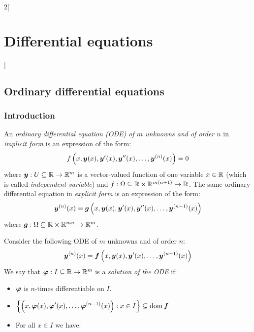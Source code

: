 \documentclass[../../../main.tex]{subfiles}
\begin{document}
\begin{multicols}{2}[\section{Differential equations}]
  \subsection{Ordinary differential equations}
  \subsubsection*{Introduction}
  \begin{definition}
    An \textit{ordinary differential equation (ODE) of $m$ unknowns and of order $n$} in \textit{implicit form} is an expression of the form: $$f\left(x,\boldsymbol{y}(x),\boldsymbol{y}'(x),\boldsymbol{y}''(x),\ldots,\boldsymbol{y}^{(n)}(x)\right)=0$$
    where $\boldsymbol{y}:U\subseteq\mathbb{R}\rightarrow\mathbb{R}^m$ is a vector-valued function of one variable $x\in\mathbb{R}$ (which is called \textit{independent variable}) and $f:\Omega\subseteq\mathbb{R}\times\mathbb{R}^{m(n+1)}\rightarrow\mathbb{R}$. The same ordinary differential equation in \textit{explicit form} is an expression of the form: $$\boldsymbol{y}^{(n)}(x)=\boldsymbol{g}\left(x,\boldsymbol{y}(x),\boldsymbol{y}'(x),\boldsymbol{y}''(x),\ldots,\boldsymbol{y}^{(n-1)}(x)\right)$$
    where $\boldsymbol{g}:\Omega\subseteq\mathbb{R}\times\mathbb{R}^{mn}\rightarrow\mathbb{R}^m$.
  \end{definition}
  \begin{definition}
    Consider the following ODE of $m$ unknowns and of order $n$:
    \begin{equation}\label{DE_ode1}
      \boldsymbol{y}^{(n)}(x)=\boldsymbol{f}\left(x,\boldsymbol{y}(x),\boldsymbol{y}'(x),\ldots,\boldsymbol{y}^{(n-1)}(x)\right)
    \end{equation}
    We say that $\boldsymbol{\varphi}:I\subseteq\mathbb{R}\rightarrow\mathbb{R}^m$ is a \textit{solution of the ODE} if:
    \begin{itemize}
      \item $\boldsymbol{\varphi}$ is $n$-times differentiable on $I$.
      \item $\displaystyle\left\{\left(x,\boldsymbol{\varphi}(x),\boldsymbol{\varphi}'(x),\ldots,\boldsymbol{\varphi}^{(n-1)}(x)\right):x\in I\right\}\subseteq\operatorname{dom} \boldsymbol{f}$
      \item For all $x\in I$ we have:

\end{itemize}
\end{definition}
\end{multicols}
\end{document}
